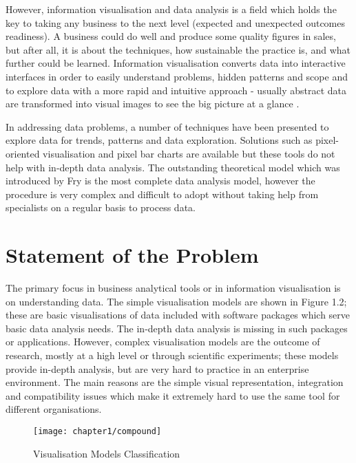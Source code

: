 However, information visualisation and data analysis is a field which holds the key to taking any business to the next level (expected and unexpected outcomes readiness). A business could do well and produce some quality figures in sales, but after all, it is about the techniques, how sustainable the practice is, and what further could be learned. Information visualisation converts data into interactive interfaces in order to easily understand problems, hidden patterns and scope and to explore data with a  more rapid and intuitive approach - usually abstract data are transformed into visual images to see the big picture at a glance \cite{6}.

In addressing data problems, a number of techniques \cite{7,8,9,eick1999visualizing,11} have been presented to explore data for trends, patterns and data exploration. Solutions such as pixel-oriented visualisation \cite{12} and pixel bar charts \cite{14} are available but these tools do not help with in-depth data analysis. The outstanding theoretical model which was introduced by Fry \cite{fry} is the most complete data analysis model, however the procedure is very complex and difficult to adopt without taking help from specialists on a regular basis to process data.


\section{Statement of the Problem}

The primary focus in business analytical tools or in information visualisation is on understanding data. The simple visualisation models are shown in Figure 1.2; these are basic visualisations of data included with software packages which serve basic data analysis needs. The in-depth data analysis is missing in such packages or applications. However, complex visualisation models are the outcome of research, mostly at a high level or through scientific experiments; these models provide in-depth analysis, but are very hard to practice in an enterprise environment. The main reasons are the simple visual representation, integration and compatibility issues which make it extremely hard to use the same tool for different organisations. 

\begin{figure}[H]
\centering
\texttt{[image: chapter1/compound]}
\caption{Visualisation Models Classification}
\end{figure}

